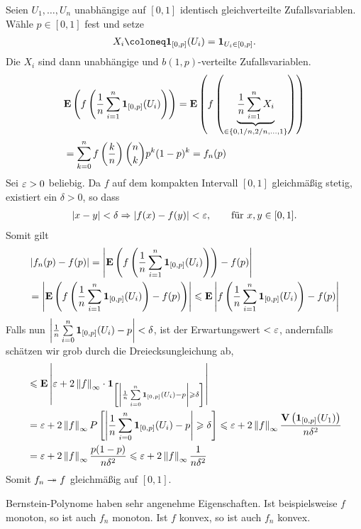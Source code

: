 \begin{bsp}
Seien $U_1,\ldots,U_n$ unabhängige auf $[0,1]$ identisch gleichverteilte
Zufallsvariablen. Wähle $p\in[0,1]$ fest und setze
\begin{align*}
X_i \defl \Id_{[0,p]}(U_i) = \Id_{U_i\in [0,p]}.
\end{align*}
Die $X_i$ sind dann unabhängige und $b(1,p)$-verteilte Zufallsvariablen.
\begin{align*}
&\textbf{E}\left(f\left(\frac{1}{n}\sum\limits_{i=1}^n \mathbf{1}_{[0,p]}(U_i)\right)\right)
= 
\textbf{E}\left(f\left(\underbrace{\frac{1}{n}\sum\limits_{i=1}^n
X_i}_{\in\left\{ 0,1/n,2/n,\ldots,1 \right\}}\right)\right)\\
&= \sum\limits_{k=0}^n f\left(\frac{k}{n}\right)\binom{n}{k}p^k(1-p)^k = f_n(p)
\end{align*}
Sei $\varepsilon > 0$ beliebig. Da $f$ auf dem kompakten Intervall $[0,1]$ gleichmäßig
stetig, existiert ein $\delta>0$, so dass
\begin{align*}
\left|x-y\right|<\delta \Rightarrow \left|f(x)-f(y)\right|<\varepsilon,\qquad \text{für } x,y\in[0,1]. 
\end{align*}
Somit gilt
\begin{align*}
&\left|f_n(p)-f(p)\right| = \left|\textbf{E}\left(f\left(\frac{1}{n}\sum\limits_{i=1}^n
\mathbf{1}_{[0,p]}(U_i)\right)\right)- f(p) \right| \\ &=
\left|\textbf{E}\left(f\left(\frac{1}{n}\sum\limits_{i=1}^n
\mathbf{1}_{[0,p]}(U_i)\right)- f(p)\right)\right|
\leqslant
\textbf{E}\left|f\left(\frac{1}{n}\sum\limits_{i=1}^n
\mathbf{1}_{[0,p]}(U_i)\right)- f(p)\right|
\end{align*}
Falls nun $\left|\frac{1}{n}\sum\limits_{i=0}^n
\mathbf{1}_{[0,p]}(U_i)-p\right|<\delta$, ist der Erwartungswert $<\varepsilon$, andernfalls
schätzen wir grob durch die Dreiecksungleichung ab,
\begin{align*}
&\leqslant \textbf{E}\left|\varepsilon+2\left\|f\right\|_\infty\cdot
\mathbf{1}_{\left[\left|\frac{1}{n}\sum\limits_{i=0}^n
\mathbf{1}_{[0,p]}(U_i)-p\right|\geqslant\delta\right]}\right|\\
&= \varepsilon + 2\left\|f\right\|_\infty P\left[\left|\frac{1}{n}\sum\limits_{i=0}^n
\mathbf{1}_{[0,p]}(U_i)-p\right|\geqslant\delta\right]
\leqslant \varepsilon + 2\left\|f\right\|_\infty \frac{\textbf{V}\left(\mathbf{1}_{[0,p]}(U_1) \right)}{n\delta^2}\\
&= \varepsilon  + 2\left\|f\right\|_\infty \frac{p(1-p)}{n\delta^2}
\leqslant \varepsilon  + 2\left\|f\right\|_\infty \frac{1}{n\delta^2}
\end{align*}
Somit $f_n\twoheadrightarrow f$ gleichmäßig auf $[0,1]$.

Bernstein-Polynome haben sehr angenehme Eigenschaften. Ist beispielsweise $f$
monoton, so ist auch $f_n$ monoton. Ist $f$ konvex, so ist auch $f_n$ konvex.
\bsphere
\end{bsp}